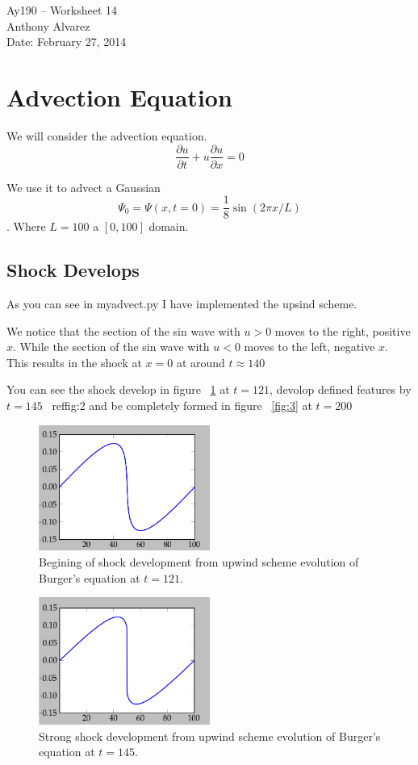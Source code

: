 \documentclass[11pt,letterpaper]{article}
\begin{document}
\begin{center}
\Large
Ay190 -- Worksheet 14\\
Anthony Alvarez\\
Date: February 27, 2014
\end{center}

\section{Advection Equation}

We will consider the advection equation.
$$ \frac{\partial u}{\partial t} + u \frac{\partial u}{\partial x} = 0$$

We use it to advect a Gaussian
$$ \Psi_0 = \Psi(x,t=0) = \frac18 \sin(2\pi x/L)$$.
Where $L = 100$ a $[0,100]$ domain. 

\subsection{Shock Develops}

As you can see in myadvect.py I have implemented the upsind scheme.

We notice that the section of the sin wave with $u>0$ moves to the right,
positive $x$. While the section of the sin wave with $u<0$ moves to the left,
negative $x$. This results in the shock at $x = 0$ at around $t \approx 140$

You can see the shock develop in figure ~\ref{fig:1} at  $t = 121$, devolop 
defined features by $t=145$ ~ref{fig:2} and be
completely formed in figure ~\ref{fig:3} at $t=200$

\begin{figure}[bth]
\centering
\includegraphics[width=0.5\textwidth]{t=121.png}
\caption{Begining of shock development from upwind scheme evolution of Burger's
equation at $t=121$.}
\label{fig:1}
\end{figure}

\begin{figure}[bth]
\centering
\includegraphics[width=0.5\textwidth]{t=145.png}
\caption{Strong shock development from upwind scheme evolution of Burger's
equation at $t=145$.}
\label{fig:2}
\end{figure}
\end{document}

